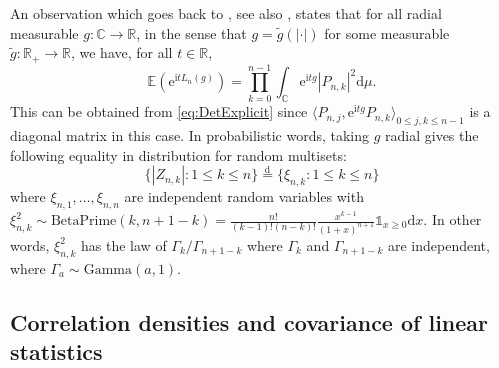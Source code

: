 \documentclass[10pt,reqno]{amsart}
\numberwithin{equation}{section}
\numberwithin{figure}{section}
\theoremstyle{plain}
\newcommand{\<}{\langle}
\renewcommand{\>}{\rangle}
\begin{document}
An observation which goes back to \cite{MR1148410}, see also \cite{MR2552864},
states that for all radial measurable $g:\mathbb{C}\to\mathbb{R}$, in the
sense that $g=\widetilde g(\left|\cdot\right|)$ for some measurable
$\widetilde g:\mathbb{R}_+\to\mathbb{R}$, we have, for all $t\in\mathbb{R}$,
\begin{equation}\label{eq:kostlan1}
  \mathbb{E}(\mathrm{e}^{\mathrm{i}tL_n(g)})
  =
  \prod_{k=0}^{n-1}\int_{\mathbb{C}}\mathrm{e}^{\mathrm{i}tg}|P_{n,k}|^2\mathrm{d}\mu.
\end{equation}
This can be obtained
from \eqref{eq:DetExplicit}
since
$\langle P_{n,j},\mathrm{e}^{\mathrm{i}tg} P_{n,k}\rangle_{0 \leq j,k \leq n-1}$
is a diagonal matrix in this case.
In probabilistic words, taking $g$ radial gives the following
equality in distribution for random multisets:
\begin{equation}\label{eq:kostlan2}
  \{|Z_{n,k}|:1\leq k\leq n\}\overset{\mathrm{d}}{=}\{\xi_{n,k}:1\leq k\leq
  n\}
\end{equation}
where $\xi_{n,1},\ldots,\xi_{n,n}$ are independent random variables
with
$\xi_{n,k}^2\sim\mathrm{BetaPrime}(k,n+1-k)=\frac{n!}{(k-1)!(n-k)!}\frac{x^{k-1}}{(1+x)^{n+1}}\mathbb{1}_{x\geq0}\mathrm{d}x$. In other words, $\xi_{n,k}^2$ has the law of $\Gamma_k/\Gamma_{n+1-k}$ where $\Gamma_k$ and $\Gamma_{n+1-k}$ are independent, where $\Gamma_a\sim\mathrm{Gamma}(a,1)$.

\subsection{Correlation densities and covariance of linear statistics}
\end{document}
